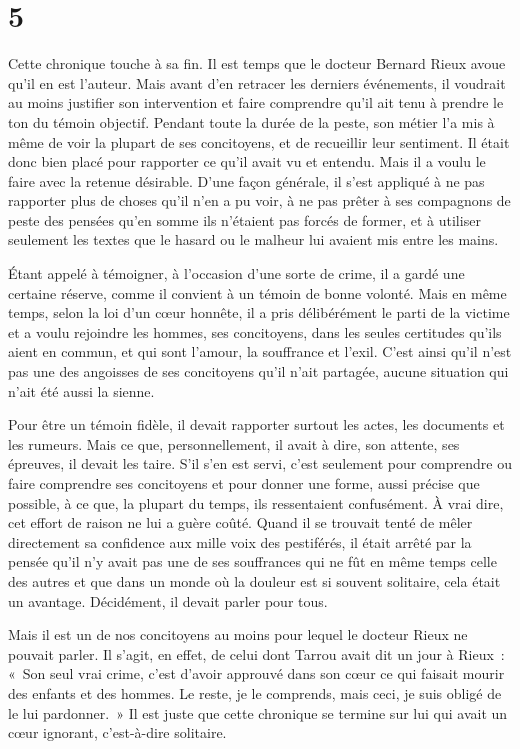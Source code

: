 \documentclass[french,twoside]{book} %
\begin{document}
\section[{5}]{5}
\noindent Cette chronique touche à sa fin. Il est temps que le docteur Bernard Rieux avoue qu’il en est l’auteur. Mais avant d’en retracer les derniers événements, il voudrait au moins justifier son intervention et faire comprendre qu’il ait tenu à prendre le ton du témoin objectif. Pendant toute la durée de la peste, son métier l’a mis à même de voir la plupart de ses concitoyens, et de recueillir leur sentiment. Il était donc bien placé pour rapporter ce qu’il avait vu et entendu. Mais il a voulu le faire avec la retenue désirable. D’une façon générale, il s’est appliqué à ne pas rapporter plus de choses qu’il n’en a pu voir, à ne pas prêter à ses compagnons de peste des pensées qu’en somme ils n’étaient pas forcés de former, et à utiliser seulement les textes que le hasard ou le malheur lui avaient mis entre les mains.\par
Étant appelé à témoigner, à l’occasion d’une sorte de crime, il a gardé une certaine réserve, comme il convient à un témoin de bonne volonté. Mais en même temps, selon la loi d’un cœur honnête, il a pris délibérément le parti de la victime et a voulu rejoindre les hommes, ses concitoyens, dans les seules certitudes qu’ils aient en commun, et qui sont l’amour, la souffrance et l’exil. C’est ainsi qu’il n’est pas une des angoisses de ses concitoyens qu’il n’ait partagée, aucune situation qui n’ait été aussi la sienne.\par
Pour être un témoin fidèle, il devait rapporter surtout les actes, les documents et les rumeurs. Mais ce que, personnellement, il avait à dire, son attente, ses épreuves, il devait les taire. S’il s’en est servi, c’est seulement pour comprendre ou faire comprendre ses concitoyens et pour donner une forme, aussi précise que possible, à ce que, la plupart du temps, ils ressentaient confusément. À vrai dire, cet effort de raison ne lui a guère coûté. Quand il se trouvait tenté de mêler directement sa confidence aux mille voix des pestiférés, il était arrêté par la pensée qu’il n’y avait pas une de ses souffrances qui ne fût en même temps celle des autres et que dans un monde où la douleur est si souvent solitaire, cela était un avantage. Décidément, il devait parler pour tous.\par
Mais il est un de nos concitoyens au moins pour lequel le docteur Rieux ne pouvait parler. Il s’agit, en effet, de celui dont Tarrou avait dit un jour à Rieux : « Son seul vrai crime, c’est d’avoir approuvé dans son cœur ce qui faisait mourir des enfants et des hommes. Le reste, je le comprends, mais ceci, je suis obligé de le lui pardonner. » Il est juste que cette chronique se termine sur lui qui avait un cœur ignorant, c’est-à-dire solitaire.\par
\end{document}

